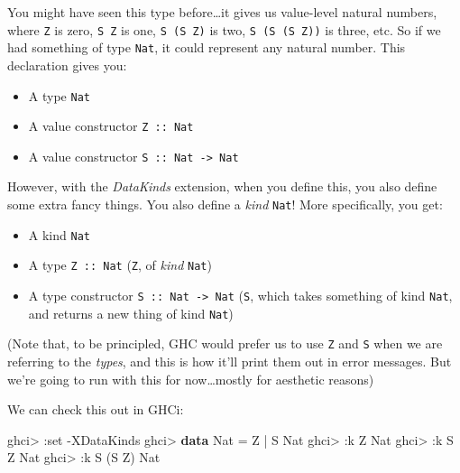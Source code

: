 \documentclass[]{article}
\newenvironment{Shaded}{}{}
\newcommand{\KeywordTok}[1]{\textcolor[rgb]{0.00,0.44,0.13}{\textbf{#1}}}
\newcommand{\DataTypeTok}[1]{\textcolor[rgb]{0.56,0.13,0.00}{#1}}
\newcommand{\FunctionTok}[1]{\textcolor[rgb]{0.02,0.16,0.49}{#1}}
\newcommand{\NormalTok}[1]{#1}
\begin{document}
You might have seen this type before\ldots{}it gives us value-level natural
numbers, where \texttt{Z} is zero, \texttt{S\ Z} is one, \texttt{S\ (S\ Z)} is
two, \texttt{S\ (S\ (S\ Z))} is three, etc. So if we had something of type
\texttt{Nat}, it could represent any natural number. This declaration gives you:

\begin{itemize}
\tightlist
\item
  A type \texttt{Nat}
\item
  A value constructor \texttt{Z\ ::\ Nat}
\item
  A value constructor \texttt{S\ ::\ Nat\ -\textgreater{}\ Nat}
\end{itemize}

However, with the \emph{DataKinds} extension, when you define this, you also
define some extra fancy things. You also define a \emph{kind} \texttt{Nat}! More
specifically, you get:

\begin{itemize}
\tightlist
\item
  A kind \texttt{Nat}
\item
  A type \texttt{Z\ ::\ Nat} (\texttt{Z}, of \emph{kind} \texttt{Nat})
\item
  A type constructor \texttt{S\ ::\ Nat\ -\textgreater{}\ Nat} (\texttt{S},
  which takes something of kind \texttt{Nat}, and returns a new thing of kind
  \texttt{Nat})
\end{itemize}

(Note that, to be principled, GHC would prefer us to use
\texttt{\textquotesingle{}Z} and \texttt{\textquotesingle{}S} when we are
referring to the \emph{types}, and this is how it'll print them out in error
messages. But we're going to run with this for now\ldots{}mostly for aesthetic
reasons)

We can check this out in GHCi:

\begin{Shaded}
\begin{Highlighting}[]
\NormalTok{ghci}\FunctionTok{>} \FunctionTok{:}\NormalTok{set }\FunctionTok{-}\DataTypeTok{XDataKinds}
\NormalTok{ghci}\FunctionTok{>} \KeywordTok{data} \DataTypeTok{Nat} \FunctionTok{=} \DataTypeTok{Z} \FunctionTok{|} \DataTypeTok{S} \DataTypeTok{Nat}
\NormalTok{ghci}\FunctionTok{>} \FunctionTok{:}\NormalTok{k }\DataTypeTok{Z}
\DataTypeTok{Nat}
\NormalTok{ghci}\FunctionTok{>} \FunctionTok{:}\NormalTok{k }\DataTypeTok{S} \DataTypeTok{Z}
\DataTypeTok{Nat}
\NormalTok{ghci}\FunctionTok{>} \FunctionTok{:}\NormalTok{k }\DataTypeTok{S}\NormalTok{ (}\DataTypeTok{S} \DataTypeTok{Z}\NormalTok{)}
\DataTypeTok{Nat}
\end{Highlighting}
\end{Shaded}
\end{document}
